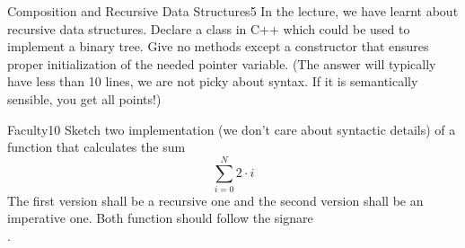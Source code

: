 \documentclass[a4paper,twoside]{article}
\begin{document}
%        
%        
%        
%
%
    \begin{task}{Composition and Recursive Data Structures}{5}{}
      In the lecture, we have learnt about recursive data structures.
      Declare a class in C++ which could be used to implement a binary tree. Give no methods except a constructor
      that ensures proper initialization of the needed pointer variable.
      (The answer will typically have less than 10 lines, we are not picky about syntax.
      If it is semantically sensible, you get all points!) \vspace{6cm}
    \end{task}
    \clearpage
    \begin{task}{Faculty}{10}{}
      Sketch two implementation (we don't care about syntactic details) of a function that calculates the sum
      \[
          \sum_{i=0}^{N} 2\cdot i
          \]
          The first version shall be a recursive one and the second version shall be an imperative one. Both function should follow
          the signare \\
          .
       
      
    \end{task}
    
\end{document}
